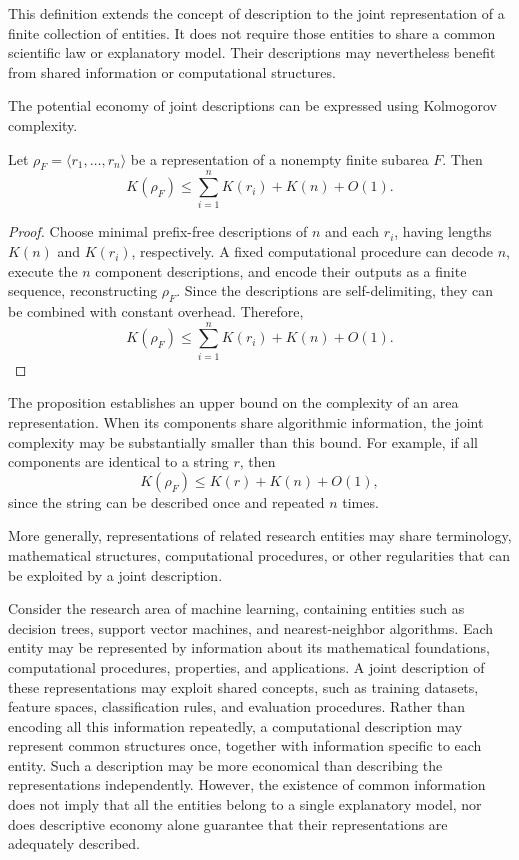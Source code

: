 This definition extends the concept of description to the joint representation of a finite collection of entities. It does not require those entities to share a common scientific law or explanatory model. Their descriptions may nevertheless benefit from shared information or computational structures.

The potential economy of joint descriptions can be expressed using Kolmogorov complexity.

\begin{proposition}
\label{prop:area_joint_complexity}
Let $\rho_F=\langle r_1,\ldots,r_n\rangle$ be a representation of a nonempty finite subarea $F$. Then
\[
K(\rho_F)\leq\sum_{i=1}^{n}K(r_i)+K(n)+O(1).
\]
\end{proposition}
\begin{proof}
Choose minimal prefix-free descriptions of $n$ and each $r_i$, having lengths $K(n)$ and $K(r_i)$, respectively.
A fixed computational procedure can decode $n$, execute the $n$ component descriptions, and encode their outputs
as a finite sequence, reconstructing $\rho_F$. Since the descriptions are self-delimiting, they can be combined with constant overhead. Therefore,
\[
K(\rho_F)\leq\sum_{i=1}^{n}K(r_i)+K(n)+O(1).
\]
\end{proof}

The proposition establishes an upper bound on the complexity of an area representation. When its components share algorithmic information, the joint complexity may be substantially smaller than this bound. For example, if all components are identical to a string $r$, then
\[
K(\rho_F)\leq K(r)+K(n)+O(1),
\]
since the string can be described once and repeated $n$ times.

More generally, representations of related research entities may share terminology, mathematical structures, computational procedures, or other regularities that can be exploited by a joint description.

\begin{example}
Consider the research area of machine learning, containing entities such as decision trees, support vector machines, and nearest-neighbor algorithms. Each entity may be represented by information about its mathematical
foundations, computational procedures, properties, and applications. A joint description of these representations may exploit shared concepts, such as training datasets, feature spaces, classification rules, and evaluation procedures. Rather than encoding all this information repeatedly, a computational description may represent common structures once, together with information specific to each entity. Such a description may be more economical than describing the representations independently. However, the existence of common information does not imply that all the entities belong to a single explanatory model, nor does descriptive economy alone guarantee that their representations are adequately described.
\end{example}

